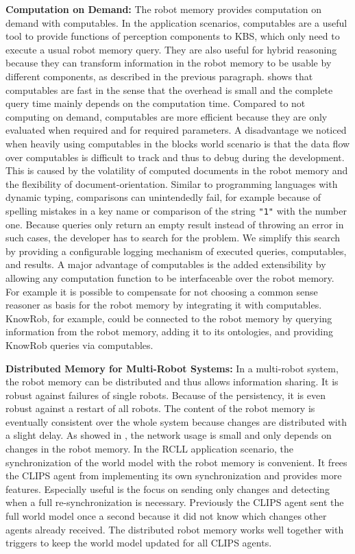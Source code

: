 \textbf{Computation on Demand:}
The robot memory provides computation on demand with computables. In
the application scenarios, computables are a useful tool to provide
functions of perception components to KBS, which only need to execute
a usual robot memory query. They are also useful for hybrid reasoning
because they can transform information in the robot memory to be
usable by different components, as described in the previous
paragraph.  shows that
computables are fast in the sense that the overhead is small and the
complete query time mainly depends on the computation time. Compared
to not computing on demand, computables are more efficient because
they are only evaluated when required and for required parameters.
A disadvantage we noticed when heavily using computables in the blocks
world scenario is that the data flow over computables is difficult to
track and thus to debug during the development. This is caused by the
volatility of computed documents in the robot memory and the
flexibility of document-orientation. Similar to programming
languages with dynamic typing, comparisons can unintendedly fail, for
example because of spelling mistakes in a key name or comparison
of the string \texttt{"1"} with the number one. Because queries
only return an empty result instead of throwing an error in such
cases, the developer has to search for the problem. We
simplify this search by providing a configurable logging mechanism of
executed queries, computables, and results.
A major advantage of computables is the added extensibility by
allowing any computation function to be interfaceable over the robot
memory. For example it is possible to compensate for not choosing a
common sense reasoner as basis for the robot memory by integrating it
with computables. KnowRob, for example, could be connected to the
robot memory by querying information from the robot memory, adding it
to its ontologies, and providing KnowRob queries via computables.

\textbf{Distributed Memory for Multi-Robot Systems:} 
In a multi-robot system, the robot memory can be distributed and thus
allows information sharing. It is robust against failures of single
robots. Because of the persistency, it is even robust against a restart
of all robots. The content of the robot memory is
eventually consistent over the whole system because changes are
distributed with a slight delay.  As showed in , the network
usage is small and only depends on changes in the robot memory. In the
RCLL application scenario, the synchronization of the world model with
the robot memory is convenient. It frees the CLIPS agent from
implementing its own synchronization and provides more
features. Especially useful is the focus on sending only changes and
detecting when a full re-synchronization is necessary. Previously the
CLIPS agent sent the full world model once a second because it did not
know which changes other agents already received. The distributed
robot memory works well together with triggers to keep the world model
updated for all CLIPS agents.

